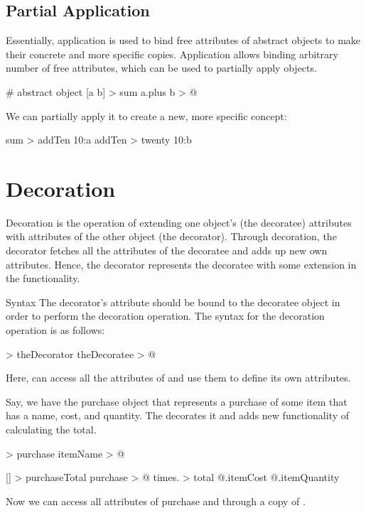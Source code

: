 \documentclass[12pt]{book}
\begin{document}
\subsection{Partial Application}

Essentially, application is used to bind free attributes of abstract objects to make their concrete and more specific copies. Application allows binding arbitrary number of free attributes, which can be used to partially apply objects.

\begin{ffcode}
# abstract object
[a b] > sum
  a.plus b > @
\end{ffcode}
We can partially apply it to create a new, more specific concept:
\begin{ffcode}
sum > addTen
  10:a
addTen > twenty
  10:b
\end{ffcode}

\section{Decoration} \label{sec:decoration}
Decoration is the operation of extending one object's (the decoratee) attributes with attributes of the other object (the decorator). Through decoration, the decorator fetches all the attributes of the decoratee and adds up new own attributes. Hence, the decorator represents the decoratee with some extension in the functionality.

Syntax
The decorator's  attribute should be bound to the decoratee object in order to perform the decoration operation.
The syntax for the decoration operation is as follows:

\begin{ffcode}
[] > theDecorator
  theDecoratee > @
\end{ffcode}
Here,  can access all the attributes of  and use them to define its own attributes.

Say, we have the purchase object that represents a purchase of some item that has a name, cost, and quantity. The  decorates it and adds new functionality of calculating the total.

\begin{ffcode}
 > purchase
  itemName > @

[] > purchaseTotal
  purchase > @
  times. > total
    @.itemCost
    @.itemQuantity
\end{ffcode}

Now we can access all attributes of purchase and  through a copy of .
\end{document}
